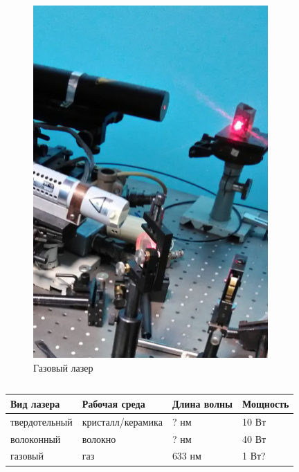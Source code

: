 \documentclass[10pt,pdf,hyperref={unicode}, dvipsnames]{beamer}
\begin{document}
\begin{frame}[t]
\begin{columns}
\begin{column}{0.3\textwidth}
\begin{figure}[h]
				\includegraphics[width=0.8\textwidth]{photo/las_g}
				\caption{Газовый лазер}
			\end{figure}	
		\end{column}		
	\end{columns}
	\begin{center}
  \begin{tabular}{*{4}{l}}
    \toprule
    Вид лазера & Рабочая среда & Длина волны & Мощность \\
    \midrule
    твердотельный & кристалл/керамика & ? нм & 10 Вт\\
    \midrule

    волоконный & волокно & ? нм & 40 Вт\\
    \midrule

    газовый & газ & 633 нм & 1 Вт?\\
    \bottomrule
  \end{tabular}		
	\end{center}
\end{frame}
\end{document}
